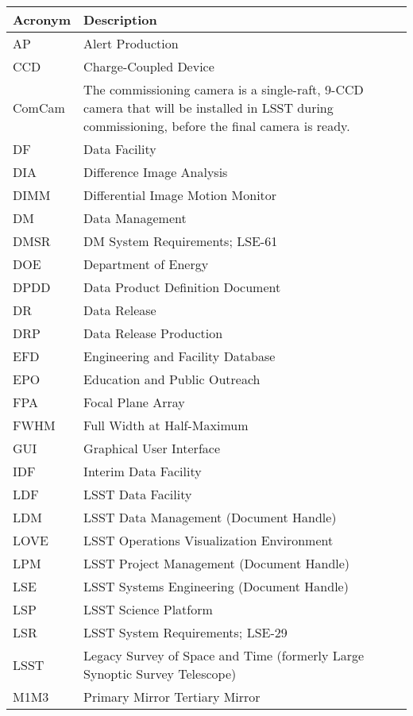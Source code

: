 \addtocounter{table}{-1}
\begin{longtable}{p{}p{}}\hline
\textbf{Acronym} & \textbf{Description}  \\\hline

AP & Alert Production \\\hline
CCD & Charge-Coupled Device \\\hline
ComCam & The commissioning camera is a single-raft, 9-CCD camera that will be installed in LSST during commissioning, before the final camera is ready. \\\hline
DF & Data Facility \\\hline
DIA & Difference Image Analysis \\\hline
DIMM & Differential Image Motion Monitor \\\hline
DM & Data Management \\\hline
DMSR & DM System Requirements; LSE-61 \\\hline
DOE & Department of Energy \\\hline
DPDD & Data Product Definition Document \\\hline
DR & Data Release \\\hline
DRP & Data Release Production \\\hline
EFD & Engineering and Facility Database \\\hline
EPO & Education and Public Outreach \\\hline
FPA & Focal Plane Array \\\hline
FWHM & Full Width at Half-Maximum \\\hline
GUI & Graphical User Interface \\\hline
IDF & Interim Data Facility \\\hline
LDF & LSST Data Facility \\\hline
LDM & LSST Data Management (Document Handle) \\\hline
LOVE & LSST Operations Visualization Environment \\\hline
LPM & LSST Project Management (Document Handle) \\\hline
LSE & LSST Systems Engineering (Document Handle) \\\hline
LSP & LSST Science Platform \\\hline
LSR & LSST System Requirements; LSE-29 \\\hline
LSST & Legacy Survey of Space and Time (formerly Large Synoptic Survey Telescope) \\\hline
M1M3 & Primary Mirror Tertiary Mirror \\\hline

\end{longtable}
